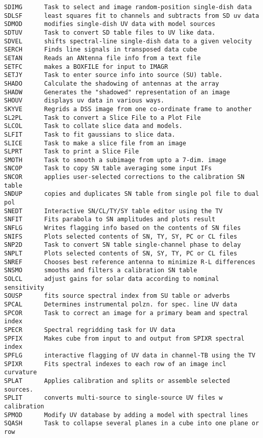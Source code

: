 \begin{verbatim}
SDIMG      Task to select and image random-position single-dish data
SDLSF      least squares fit to channels and subtracts from SD uv data
SDMOD      modifies single-dish UV data with model sources
SDTUV      Task to convert SD table files to UV like data.
SDVEL      shifts spectral-line single-dish data to a given velocity
SERCH      Finds line signals in transposed data cube
SETAN      Reads an ANtenna file info from a text file
SETFC      makes a BOXFILE for input to IMAGR
SETJY      Task to enter source info into source (SU) table.
SHADO      Calculate the shadowing of antennas at the array
SHADW      Generates the "shadowed" representation of an image
SHOUV      displays uv data in various ways.
SKYVE      Regrids a DSS image from one co-ordinate frame to another
SL2PL      Task to convert a Slice File to a Plot File
SLCOL      Task to collate slice data and models.
SLFIT      Task to fit gaussians to slice data.
SLICE      Task to make a slice file from an image
SLPRT      Task to print a Slice File
SMOTH      Task to smooth a subimage from upto a 7-dim. image
SNCOP      Task to copy SN table averaging some input IFs
SNCOR      applies user-selected corrections to the calibration SN table
SNDUP      copies and duplicates SN table from single pol file to dual pol
SNEDT      Interactive SN/CL/TY/SY table editor using the TV
SNFIT      Fits parabola to SN amplitudes and plots result
SNFLG      Writes flagging info based on the contents of SN files
SNIFS      Plots selected contents of SN, TY, SY, PC or CL files
SNP2D      Task to convert SN table single-channel phase to delay
SNPLT      Plots selected contents of SN, SY, TY, PC or CL files
SNREF      Chooses best reference antenna to minimize R-L differences
SNSMO      smooths and filters a calibration SN table
SOLCL      adjust gains for solar data according to nominal sensitivity
SOUSP      fits source spectral index from SU table or adverbs
SPCAL      Determines instrumental polzn. for spec. line UV data
SPCOR      Task to correct an image for a primary beam and spectral index
SPECR      Spectral regridding task for UV data
SPFIX      Makes cube from input to and output from SPIXR spectral index
SPFLG      interactive flagging of UV data in channel-TB using the TV
SPIXR      Fits spectral indexes to each row of an image incl curvature
SPLAT      Applies calibration and splits or assemble selected sources.
SPLIT      converts multi-source to single-source UV files w calibration
SPMOD      Modify UV database by adding a model with spectral lines
SQASH      Task to collapse several planes in a cube into one plane or row

\end{verbatim}
